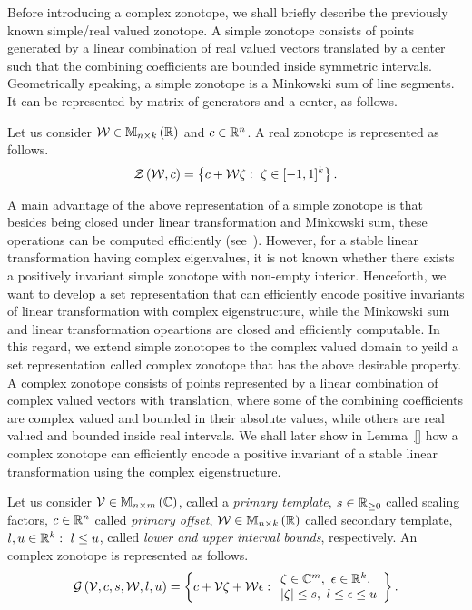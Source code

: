 Before introducing a complex zonotope, we shall briefly describe the
previously known simple/real valued zonotope.  A simple zonotope
consists of points generated by a linear combination of real valued
vectors translated by a center such that the combining coefficients
are bounded inside symmetric intervals.  Geometrically speaking, a
simple zonotope is a Minkowski sum of line segments.  It can be
represented by matrix of generators and a center, as follows.
%
\begin{definition}
Let us consider $\mathcal{W}\in\mathbb{M}_{n\times k}\left(\mathbb{R}\right)$ and $c\in\mathbb{R}^n$.
A real zonotope is represented as follows.
%
\[
\mathit{\mathcal{Z}}\left(\mathcal{W},c\right) = \left\{c+\mathcal{W}\zeta:~\zeta\in[-1,1]^k\right\}.
\]
%
\end{definition}
%
A main advantage of the above representation of a simple zonotope is
that besides being closed under linear transformation and Minkowski
sum, these operations can be computed efficiently (see~\cite{todo}).
However, for a stable linear transformation having complex
eigenvalues, it is not known whether there exists a positively
invariant simple zonotope with non-empty interior.  %
Henceforth, we want to
develop a set representation that can efficiently encode positive
invariants of linear transformation with complex eigenstructure, while
the Minkowski sum and linear transformation opeartions are closed and
efficiently computable.  In this regard, we extend simple
zonotopes to the complex valued domain to yeild a set
representation called complex zonotope that has the above
desirable property.  A complex zonotope consists of points represented
by a linear combination of complex valued vectors with translation,
where some of the combining coefficients are complex valued and
bounded in their absolute values, while others are real valued and
bounded inside real intervals.  We shall later show in Lemma~\ref{}
how a complex zonotope can efficiently encode a positive invariant of
a stable linear transformation using the complex eigenstructure.
%
\begin{definition}
Let us consider $\mathcal{V}\in\mathbb{M}_{n\times m}\left(\mathbb{C}\right)$, called a
\emph{primary template}, $s\in\mathbb{R}_{\geq 0}$ called scaling
factors, $c\in\mathbb{R}^n$ called \emph{primary offset},
$\mathcal{W}\in\mathbb{M}_{n\times k}\left(\mathbb{R}\right)$ called secondary template,
$l,u\in\mathbb{R}^k:~l\leq u$, called \emph{lower and upper
  interval bounds}, respectively.  An complex zonotope is
represented as follows.
%
\[
\mathcal{G}\left(\mathcal{V},c,s,\mathcal{W},l,u\right) =
\left\{
  c+\mathcal{V}\zeta+\mathcal{W}\epsilon:
  \begin{array}{l}
    \zeta\in\mathbb{C}^m,~\epsilon\in\mathbb{R}^k,\\
    \left|\zeta\right|\leq
    s,~l\leq\epsilon\leq u
   \end{array}
\right\}.
\]
%
\end{definition}
